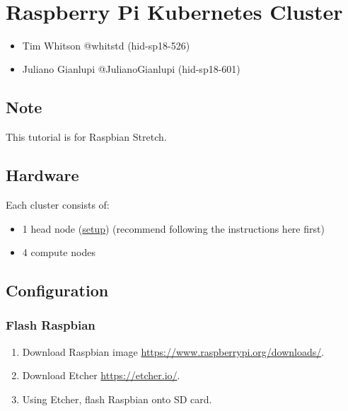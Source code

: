 \MDNAME\

\section{Raspberry Pi Kubernetes Cluster}

\begin{itemize}
\item
  Tim Whitson @whitstd (hid-sp18-526)
\item
  Juliano Gianlupi @JulianoGianlupi (hid-sp18-601)
\end{itemize}

\subsection{Note}

This tutorial is for Raspbian Stretch.

\subsection{Hardware}

Each cluster consists of:

\begin{itemize}
\item
  1 head node (\href{head}{setup}) (recommend following the instructions
  here first)
\item
  4 compute nodes
\end{itemize}

\subsection{Configuration}

\subsubsection{Flash Raspbian}

\begin{enumerate}
\def\labelenumi{\arabic{enumi}.}
\item
  Download Raspbian image \url{https://www.raspberrypi.org/downloads/}.
\item
  Download Etcher \url{https://etcher.io/}.
\item
  Using Etcher, flash Raspbian onto SD card.
\end{enumerate}

